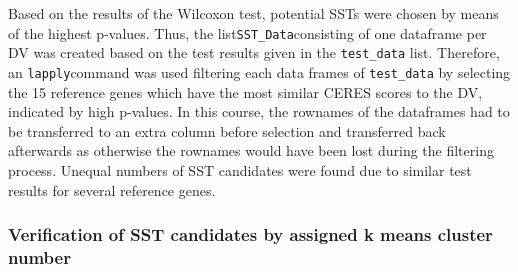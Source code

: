 \documentclass[]{article}
\newenvironment{Shaded}{\begin{snugshade}}{\end{snugshade}}
\newcommand{\CommentTok}[1]{\textcolor[rgb]{0.56,0.35,0.01}{\textit{#1}}}
\newcommand{\ControlFlowTok}[1]{\textcolor[rgb]{0.13,0.29,0.53}{\textbf{#1}}}
\newcommand{\DataTypeTok}[1]{\textcolor[rgb]{0.13,0.29,0.53}{#1}}
\newcommand{\DecValTok}[1]{\textcolor[rgb]{0.00,0.00,0.81}{#1}}
\newcommand{\KeywordTok}[1]{\textcolor[rgb]{0.13,0.29,0.53}{\textbf{#1}}}
\newcommand{\NormalTok}[1]{#1}
\newcommand{\OperatorTok}[1]{\textcolor[rgb]{0.81,0.36,0.00}{\textbf{#1}}}
\newcommand{\StringTok}[1]{\textcolor[rgb]{0.31,0.60,0.02}{#1}}
\begin{document}
Based on the results of the Wilcoxon test, potential SSTs were chosen by
means of the highest p-values. Thus, the
list\texttt{SST\_Data}consisting of one dataframe per DV was created
based on the test results given in the \texttt{test\_data} list.
Therefore, an \texttt{lapply}command was used filtering each data frames
of \texttt{test\_data} by selecting the 15 reference genes which have
the most similar CERES scores to the DV, indicated by high p-values. In
this course, the rownames of the dataframes had to be transferred to an
extra column before selection and transferred back afterwards as
otherwise the rownames would have been lost during the filtering
process. Unequal numbers of SST candidates were found due to similar
test results for several reference genes.

\begin{Shaded}
\end{Shaded}

\hypertarget{verification-of-sst-candidates-by-assigned-k-means-cluster-number}{%
\subsubsection{Verification of SST candidates by assigned k means
cluster
number}\label{verification-of-sst-candidates-by-assigned-k-means-cluster-number}}
\end{document}
